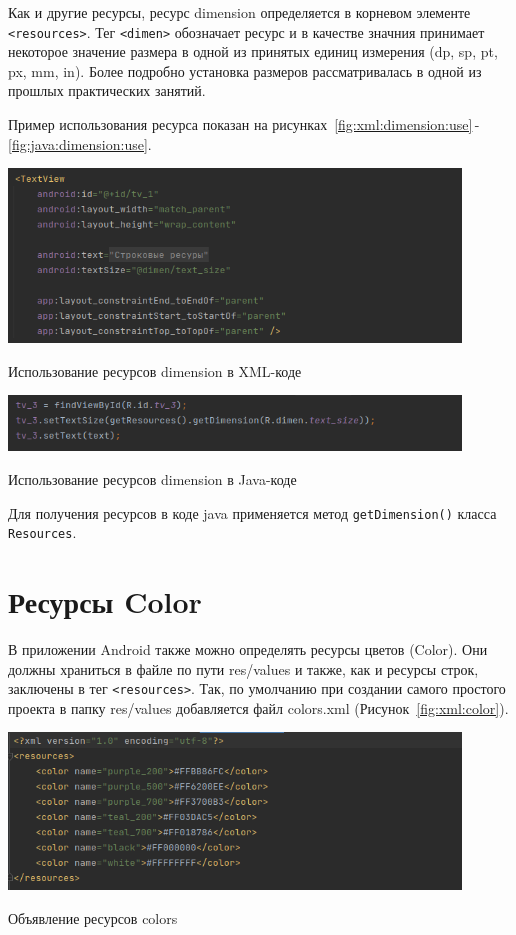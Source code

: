 Как и другие ресурсы, ресурс dimension определяется в корневом элементе
\texttt{<resources>}. Тег \texttt{<dimen>} обозначает ресурс и в качестве
значния принимает некоторое значение размера в одной из принятых единиц
измерения (dp, sp, pt, px, mm, in). Более подробно установка размеров
рассматривалась в одной из прошлых практических занятий.\par
Пример использования ресурса показан на
рисунках~\ref{fig:xml:dimension:use}\,-\,\ref{fig:java:dimension:use}.

\begin{image}
	\includegraphics[width=0.9\textwidth]{Screenshot from 2023-03-30 19-21-28}
	\caption{Использование ресурсов dimension в XML-коде}
	\label{fig:xml:dimension:use}
\end{image}

\begin{image}
	\includegraphics[width=0.9\textwidth]{Screenshot from 2023-03-30 19-44-25}
	\caption{Использование ресурсов dimension в Java-коде}
	\label{fig:java:dimension:use}
\end{image}

Для получения ресурсов в коде java применяется метод \texttt{getDimension()}
класса \texttt{Resources}.

\section{Ресурсы Color}
В приложении Android также можно определять ресурсы цветов (Color). Они
должны храниться в файле по пути res/values и также, как и ресурсы строк,
заключены в тег \texttt{<resources>}. Так, по умолчанию при создании самого
простого проекта в папку res/values добавляется файл colors.xml
(Рисунок~\ref{fig:xml:color}).

\begin{image}
	\includegraphics[width=0.9\textwidth]{Screenshot from 2023-03-30 19-25-31}
	\caption{Объявление ресурсов colors}
	\label{fig:xml:color}
\end{image}

